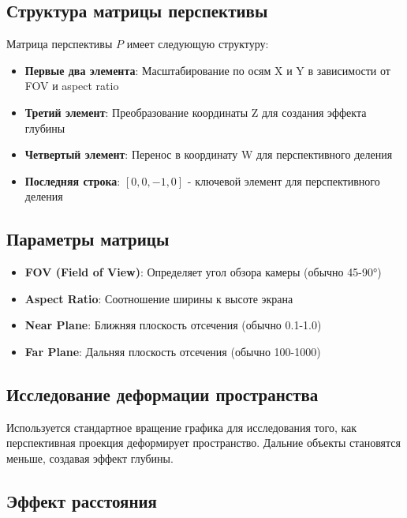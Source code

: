 \subsection*{Структура матрицы перспективы}

Матрица перспективы $P$ имеет следующую структуру:
\begin{itemize}
\item \textbf{Первые два элемента}: Масштабирование по осям X и Y в зависимости от FOV и aspect ratio
\item \textbf{Третий элемент}: Преобразование координаты Z для создания эффекта глубины
\item \textbf{Четвертый элемент}: Перенос в координату W для перспективного деления
\item \textbf{Последняя строка}: $[0, 0, -1, 0]$ - ключевой элемент для перспективного деления
\end{itemize}

\subsection*{Параметры матрицы}

\begin{itemize}
\item \textbf{FOV (Field of View)}: Определяет угол обзора камеры (обычно 45-90°)
\item \textbf{Aspect Ratio}: Соотношение ширины к высоте экрана
\item \textbf{Near Plane}: Ближняя плоскость отсечения (обычно 0.1-1.0)
\item \textbf{Far Plane}: Дальняя плоскость отсечения (обычно 100-1000)
\end{itemize}

\subsection*{Исследование деформации пространства}

Используется стандартное вращение графика для исследования того, как перспективная проекция деформирует пространство. Дальние объекты становятся меньше, создавая эффект глубины.

\subsection*{Эффект расстояния}

